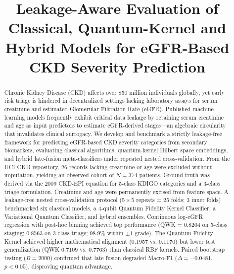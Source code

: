 \documentclass[10pt,conference]{IEEEtran}
\begin{document}
\title{Leakage-Aware Evaluation of Classical, Quantum-Kernel and Hybrid Models for eGFR-Based CKD Severity Prediction}

\author{
}

\maketitle

\begin{abstract}
Chronic Kidney Disease (CKD) affects over 850 million individuals globally, yet early risk triage is hindered in decentralized settings lacking laboratory assays for serum creatinine and estimated Glomerular Filtration Rate (eGFR). Published machine learning models frequently exhibit critical data leakage by retaining serum creatinine and age as input predictors to estimate eGFR-derived stages---an algebraic circularity that invalidates clinical surrogacy. We develop and benchmark a strictly leakage-free framework for predicting eGFR-based CKD severity categories from secondary biomarkers, evaluating classical algorithms, quantum-kernel Hilbert space embeddings, and hybrid late-fusion meta-classifiers under repeated nested cross-validation. From the UCI CKD repository, 26 records lacking creatinine or age were excluded without imputation, yielding an observed cohort of $N = 374$ patients. Ground truth was derived via the 2009 CKD-EPI equation for 5-class KDIGO categories and a 3-class triage formulation. Creatinine and age were permanently excised from feature space. A leakage-free nested cross-validation protocol ($5 \times 5$ repeats = 25 folds; 3 inner folds) benchmarked six classical models, a 4-qubit Quantum Fidelity Kernel Classifier, a Variational Quantum Classifier, and hybrid ensembles. Continuous log-eGFR regression with post-hoc binning achieved top performance (QWK = 0.8204 on 5-class staging; 0.8563 on 3-class triage; 98.9\% within $\pm 1$ grade). The Quantum Fidelity Kernel achieved higher mathematical alignment (0.1957 vs. 0.1170) but lower test generalization (QWK 0.7109 vs. 0.7763) than classical RBF kernels. Paired bootstrap testing ($B = 2000$) confirmed that late fusion degraded Macro-F1 ($\Delta = -0.0481$, $p < 0.05$), disproving quantum advantage.
\end{abstract}
\end{document}
